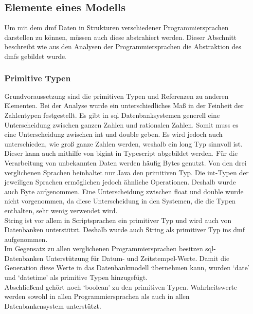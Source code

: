 \documentclass[./einleitung.tex]{subfiles}
\begin{document}
    \subsection{Elemente eines Modells}\label{subsec:elemente-eines-modells}
    Um mit dem \acrshort{dmf} Daten in Strukturen verschiedener Programmiersprachen darstellen zu können, müssen auch diese abstrahiert werden.
    Dieser Abschnitt beschreibt wie aus den Analysen der Programmiersprachen die Abstraktion des \acrshort{dmf}s gebildet wurde.

    \subsubsection{Primitive Typen}
    Grundvoraussetzung sind die primitiven Typen und Referenzen zu anderen Elementen.
    Bei der Analyse wurde ein unterschiedliches Maß in der Feinheit der Zahlentypen festgestellt.
    Es gibt in \acrfull{sql} Datenbanksystemen generell eine Unterscheidung zwischen ganzen Zahlen und rationalen Zahlen.
    Somit muss es eine Unterscheidung zwischen int und double geben.
    Es wird jedoch auch unterschieden, wie groß ganze Zahlen werden, weshalb ein long Typ sinnvoll ist.
    Dieser kann auch mithilfe von bigint in Typescript abgebildet werden.
    Für die Verarbeitung von unbekannten Daten werden häufig Bytes genutzt.
    Von den drei verglichenen Sprachen beinhaltet nur Java den primitiven Typ.
    Die int-Typen der jeweiligen Sprachen ermöglichen jedoch ähnliche Operationen.
    Deshalb wurde auch Byte aufgenommen.
    Eine Unterscheidung zwischen float und double wurde nicht vorgenommen, da diese Unterscheidung in den Systemen, die die Typen enthalten, sehr wenig verwendet wird.\\
    String ist vor allem in Scriptsprachen ein primitiver Typ und wird auch von Datenbanken unterstützt.
    Deshalb wurde auch String als primitiver Typ ins \acrshort{dmf} aufgenommen.\\
    Im Gegensatz zu allen verglichenen Programmiersprachen besitzen \acrshort{sql}-Datenbanken Unterstützung für Datum- und Zeitstempel-Werte.
    Damit die Generation diese Werte in das Datenbankmodell übernehmen kann, wurden `date' und `datetime' als primitive Typen hinzugefügt. \\
    Abschließend gehört noch `boolean' zu den primitiven Typen.
    Wahrheitswerte werden sowohl in allen Programmiersprachen als auch in allen Datenbankensystem unterstützt. \\
\end{document}
